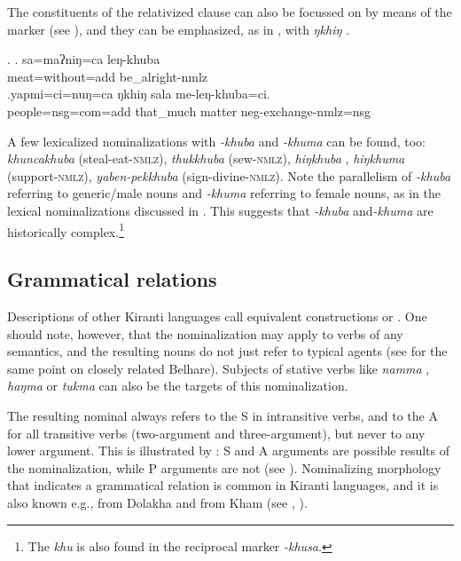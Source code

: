 The constituents of the relativized clause can also be focussed on by means of the  marker (see \Next[a]), and  they can be emphasized, as in \Next[b], with \emph{ŋkhiŋ} .

   \ex. \ag. sa=maʔniŋ=ca leŋ-khuba\\
		meat=without{\sc =add} be\_alright{\sc -nmlz}\\
	\bg.yapmi=ci=nuŋ=ca  ŋkhiŋ   sala   me-leŋ-khuba=ci.\\
		people{\sc =nsg=com=add} that\_much matter {\sc neg}-exchange-{\sc nmlz=nsg}\\
	      

	
A few lexicalized nominalizations with \emph{-khuba} and \emph{-khuma} can be found, too: \emph{khuncakhuba}  (steal-eat-\textsc{nmlz}), \emph{thukkhuba}  (sew-\textsc{nmlz}), \emph{hiŋ\-khuba} , \emph{hiŋ\-khuma}  (support-\textsc{nmlz}), \emph{yaben-pekkhuba}  (sign-div\-ine-\textsc{nmlz}). Note the parallelism of \emph{-khuba} referring to generic/male nouns and \emph{-khuma} referring to female nouns, as in the lexical nominalizations discussed in . This suggests that \emph{-khuba} and\emph{-khuma} are historically complex.\footnote{The  \emph{khu} is also found in the reciprocal marker \emph{-khusa}.}

\subsection{Grammatical relations}\label{khuba-gr}

Descriptions of other Kiranti languages call equivalent constructions  or  \citep{Tolsma1999A-grammar, Rutgers1998Yamphu, Ebert1997A-grammar, Ebert1999Nonfinite, Doornenbal2009A-grammar}. One should note, however, that the nominalization may apply to verbs of any semantics, and the resulting nouns do not just refer to typical agents (see \citet[180]{Bickel2004Hidden} for the same point on closely related Belhare). Subjects of stative verbs like \emph{namma} , \emph{haŋma}  or \emph{tukma}  can also be the targets of this nominalization. 
 
The resulting nominal always refers to the S in intransitive verbs, and to the A for all transitive verbs (two-argument and three-argument), but never to any lower argument. This is illustrated by \Next: S and A arguments are possible results of the nominalization, while P arguments are not (see \Next[c]). Nominalizing morphology that indicates a grammatical relation is common in Kiranti languages, and it is also known e.g., from  Dolakha  and from Kham (see \citet[409]{Genetti1992Semantic}, \citealt[376]{Ebert1999Nonfinite}). 
	
